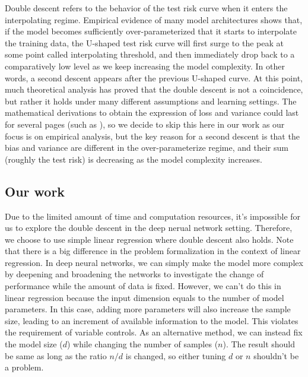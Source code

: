 \documentclass{article}
\begin{document}
\vspace{-3mm}
Double descent refers to the behavior of the test risk curve when it enters the interpolating regime. Empirical evidence of many model architectures shows that, if the model becomes sufficiently over-parameterized that it starts to interpolate the training data, the U-shaped test risk curve will first surge to the peak at some point called interpolating threshold, and then immediately drop back to a comparatively low level as we keep increasing the model complexity. In other words, a second descent appears after the previous U-shaped curve. At this point, much theoretical analysis has proved that the double descent is not a coincidence, but rather it holds under many different assumptions and learning settings. The mathematical derivations to obtain the expression of loss and variance could last for several pages (such as \cite{hastie2022surprises}), so we decide to skip this here in our work as our focus is on empirical analysis, but the key reason for a second descent is that the bias and variance are different in the over-parameterize regime, and their sum (roughly the test risk) is decreasing as the model complexity increases.

\vspace{-2mm}
\subsection{Our work} \label{our}
\vspace{-1mm}
Due to the limited amount of time and computation resources, it's impossible for us to explore the double descent in the deep nerual network setting. Therefore, we choose to use simple linear regression where double descent also holds. Note that there is a big difference in the problem formalization in the context of linear regression. In deep neural networks, we can simply make the model more complex by deepening and broadening the networks to investigate the change of performance while the amount of data is fixed. However, we can't do this in linear regression because the input dimension equals to the number of model parameters. In this case, adding more parameters will also increase the sample size, leading to an increment of available information to the model. This violates the requirement of variable controls. As an alternative method, we can instead fix the model size ($d$) while changing the number of samples ($n$). The result should be same as long as the ratio $n/d$ is changed, so either tuning $d$ or $n$ shouldn't be a problem.\\
\end{document}
